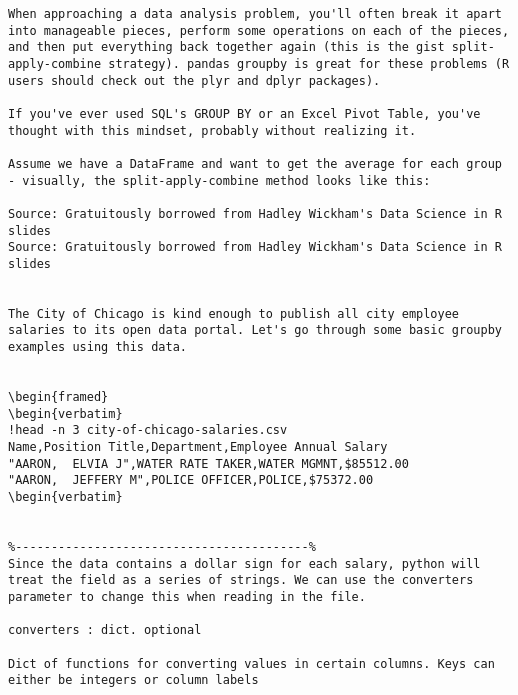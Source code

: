 \begin{framed}
\begin{framed}
\begin{framed}
\begin{framed}
\begin{framed}
\begin{framed}
\begin{framed}
\begin{framed}
\begin{framed}
\begin{framed}
\begin{framed}
\begin{framed}
\begin{framed}
\begin{framed}
\begin{framed}
\begin{framed}
\begin{framed}
\begin{framed}
\begin{verbatim}
When approaching a data analysis problem, you'll often break it apart into manageable pieces, perform some operations on each of the pieces, and then put everything back together again (this is the gist split-apply-combine strategy). pandas groupby is great for these problems (R users should check out the plyr and dplyr packages).

If you've ever used SQL's GROUP BY or an Excel Pivot Table, you've thought with this mindset, probably without realizing it.

Assume we have a DataFrame and want to get the average for each group - visually, the split-apply-combine method looks like this:

Source: Gratuitously borrowed from Hadley Wickham's Data Science in R slides
Source: Gratuitously borrowed from Hadley Wickham's Data Science in R slides


The City of Chicago is kind enough to publish all city employee salaries to its open data portal. Let's go through some basic groupby examples using this data.


\begin{framed}
\begin{verbatim}
!head -n 3 city-of-chicago-salaries.csv
Name,Position Title,Department,Employee Annual Salary
"AARON,  ELVIA J",WATER RATE TAKER,WATER MGMNT,$85512.00
"AARON,  JEFFERY M",POLICE OFFICER,POLICE,$75372.00
\begin{verbatim}


%-----------------------------------------%
Since the data contains a dollar sign for each salary, python will treat the field as a series of strings. We can use the converters parameter to change this when reading in the file.

converters : dict. optional

Dict of functions for converting values in certain columns. Keys can either be integers or column labels


\end{verbatim}
\end{framed}
\end{framed}
\end{framed}
\end{framed}
\end{framed}
\end{framed}
\end{framed}
\end{framed}
\end{framed}
\end{framed}
\end{framed}
\end{framed}
\end{framed}
\end{framed}
\end{framed}
\end{framed}
\end{framed}
\end{framed}
